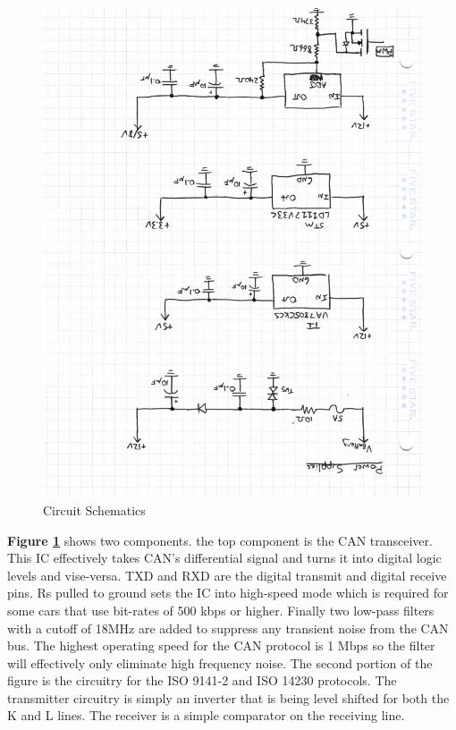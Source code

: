 \documentclass[12pt,letterpaper]{article}
\begin{document}
\begin{figure}[H]
\centering
\includegraphics[page=4, totalheight=20cm, angle=180]{images/circuit_sch.pdf}
\caption{Circuit Schematics}
\label{fig:can}
\end{figure}

\textbf{Figure \ref{fig:can}} shows two components. the top component is the CAN transceiver. This IC effectively takes CAN's differential signal and turns it into digital logic levels and vise-versa. TXD and RXD are the digital transmit and digital receive pins. Rs pulled to ground sets the IC into high-speed mode which is required for some cars that use bit-rates of 500 kbps or higher. Finally two low-pass filters with a cutoff of 18MHz are added to suppress any transient noise from the CAN bus. The highest operating speed for the CAN protocol is 1 Mbps so the filter will effectively only eliminate high frequency noise. The second portion of the figure is the circuitry for the ISO 9141-2 and ISO 14230 protocols. The transmitter circuitry is simply an inverter that is being level shifted for both the K and L lines. The receiver is a simple comparator on the receiving line.
\end{document}
